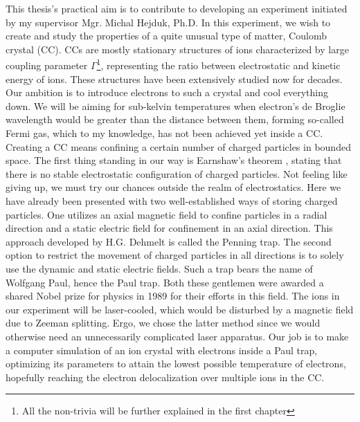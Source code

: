 
This thesis's practical aim is to contribute to developing an experiment initiated by my supervisor Mgr. Michal Hejduk, Ph.D. In this experiment, we wish to create and study the properties of a quite unusual type of matter, Coulomb crystal (CC). CCs are mostly stationary structures of ions characterized by large coupling parameter $\Gamma$\footnote{All the non-trivia will be further explained in the first chapter}, representing the ratio between electrostatic and kinetic energy of ions. These structures have been extensively studied now for decades. Our ambition is to introduce electrons to such a crystal and cool everything down. We will be aiming for sub-kelvin temperatures when electron's de Broglie wavelength would be greater than the distance between them, forming so-called Fermi gas, which to my knowledge, has not been achieved yet inside a CC. Creating a CC means confining a certain number of charged particles in bounded space. The first thing standing in our way is Earnshaw's theorem \cite{earnshaw1848nature}, stating that there is no stable electrostatic configuration of charged particles. Not feeling like giving up, we must try our chances outside the realm of electrostatics. Here we have already been presented with two well-established ways of storing charged particles. One utilizes an axial magnetic field to confine particles in a radial direction and a static electric field for confinement in an axial direction. This approach developed by H.G. Dehmelt is called the Penning trap. The second option to restrict the movement of charged particles in all directions is to solely use the dynamic and static electric fields. Such a trap bears the name of Wolfgang Paul, hence the Paul trap. Both these gentlemen were awarded a shared Nobel prize for physics in 1989 for their efforts in this field. The ions in our experiment will be laser-cooled, which would be disturbed by a magnetic field due to Zeeman splitting. Ergo, we chose the latter method since we would otherwise need an unnecessarily complicated laser apparatus. Our job is to make a computer simulation of an ion crystal with electrons inside a Paul trap, optimizing its parameters to attain the lowest possible temperature of electrons, hopefully reaching the electron delocalization over multiple ions in the CC.

